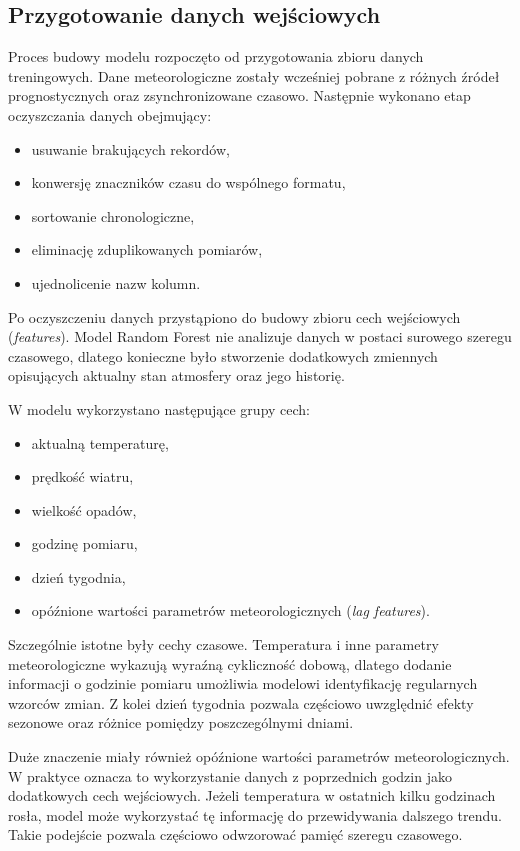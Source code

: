 \documentclass[a4paper,12pt]{article}
\begin{document}
\begin{table}[h]
\begin{table}[h]
\begin{table}[h]
\begin{table}[h]
\subsection{Przygotowanie danych wejściowych}

Proces budowy modelu rozpoczęto od przygotowania zbioru danych treningowych. Dane meteorologiczne zostały wcześniej pobrane z różnych źródeł prognostycznych oraz zsynchronizowane czasowo. Następnie wykonano etap oczyszczania danych obejmujący:

\begin{itemize}
    \item usuwanie brakujących rekordów,
    \item konwersję znaczników czasu do wspólnego formatu,
    \item sortowanie chronologiczne,
    \item eliminację zduplikowanych pomiarów,
    \item ujednolicenie nazw kolumn.
\end{itemize}

\noindent
Po oczyszczeniu danych przystąpiono do budowy zbioru cech wejściowych (\textit{features}). Model Random Forest nie analizuje danych w postaci surowego szeregu czasowego, dlatego konieczne było stworzenie dodatkowych zmiennych opisujących aktualny stan atmosfery oraz jego historię.

\noindent
W modelu wykorzystano następujące grupy cech:

\begin{itemize}
    \item aktualną temperaturę,
    \item prędkość wiatru,
    \item wielkość opadów,
    \item godzinę pomiaru,
    \item dzień tygodnia,
    \item opóźnione wartości parametrów meteorologicznych (\textit{lag features}).
\end{itemize}

\noindent
Szczególnie istotne były cechy czasowe. Temperatura i inne parametry meteorologiczne wykazują wyraźną cykliczność dobową, dlatego dodanie informacji o godzinie pomiaru umożliwia modelowi identyfikację regularnych wzorców zmian. Z kolei dzień tygodnia pozwala częściowo uwzględnić efekty sezonowe oraz różnice pomiędzy poszczególnymi dniami.

\noindent
Duże znaczenie miały również opóźnione wartości parametrów meteorologicznych. W praktyce oznacza to wykorzystanie danych z poprzednich godzin jako dodatkowych cech wejściowych. Jeżeli temperatura w ostatnich kilku godzinach rosła, model może wykorzystać tę informację do przewidywania dalszego trendu. Takie podejście pozwala częściowo odwzorować pamięć szeregu czasowego.


\end{table}
\end{table}
\end{table}
\end{table}
\end{document}
